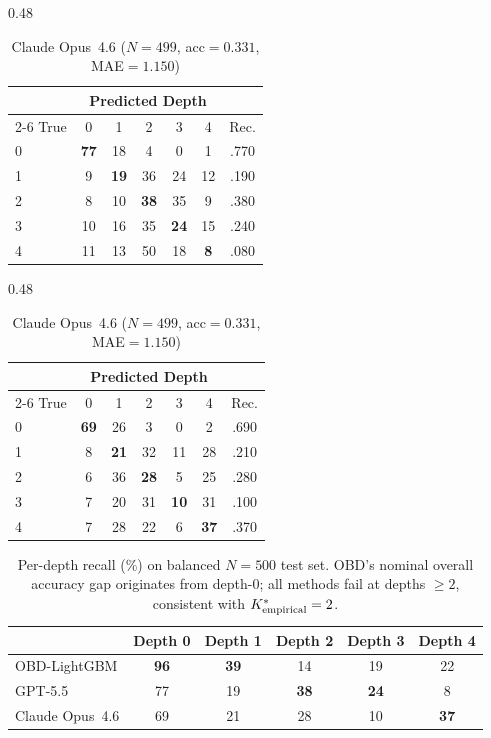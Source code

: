 \begin{table}[t]
  \vspace{0.5em}
  \begin{subtable}{0.48\textwidth}
    \centering
    \caption{GPT-5.5 ($N{=}500$, acc${=}0.332$, MAE${=}1.102$)}
    \label{tab:s3a_gpt55}
    \small
    \begin{tabular}{lcccccc}
      \toprule
      & \multicolumn{5}{c}{Predicted Depth} & \\
      \cmidrule(lr){2-6}
      True & 0 & 1 & 2 & 3 & 4 & Rec. \\
      \midrule
      0 & \textbf{77} & 18 &  4 &  0 &  1 & .770 \\
      1 &  9 & \textbf{19} & 36 & 24 & 12 & .190 \\
      2 &  8 & 10 & \textbf{38} & 35 &  9 & .380 \\
      3 & 10 & 16 & 35 & \textbf{24} & 15 & .240 \\
      4 & 11 & 13 & 50 & 18 &  \textbf{8} & .080 \\
      \bottomrule
    \end{tabular}
  \end{subtable}
  \hfill
  \begin{subtable}{0.48\textwidth}
    \centering
    \caption{Claude Opus~4.6 ($N{=}499$, acc${=}0.331$, MAE${=}1.150$)}
    \label{tab:s3b_claude}
    \small
    \begin{tabular}{lcccccc}
      \toprule
      & \multicolumn{5}{c}{Predicted Depth} & \\
      \cmidrule(lr){2-6}
      True & 0 & 1 & 2 & 3 & 4 & Rec. \\
      \midrule
      0 & \textbf{69} & 26 &  3 &  0 &  2 & .690 \\
      1 &  8 & \textbf{21} & 32 & 11 & 28 & .210 \\
      2 &  6 & 36 & \textbf{28} &  5 & 25 & .280 \\
      3 &  7 & 20 & 31 & \textbf{10} & 31 & .100 \\
      4 &  7 & 28 & 22 &  6 & \textbf{37} & .370 \\
      \bottomrule
    \end{tabular}
  \end{subtable}
\end{table}

\begin{table}[t]
  \centering
  \small
  \caption{Per-depth recall (\%) on balanced $N{=}500$ test set. OBD's nominal overall accuracy gap originates from depth-0; all methods fail at depths $\geq 2$, consistent with ${K^*_{\text{empirical}}} = 2$.}
  \label{tab:s3c_perdepth}
  \begin{tabular}{lccccc}
    \toprule
    & Depth 0 & Depth 1 & Depth 2 & Depth 3 & Depth 4 \\
    \midrule
    OBD-LightGBM & \textbf{96} & \textbf{39} & 14 & 19 & 22 \\
    GPT-5.5      & 77 & 19 & \textbf{38} & \textbf{24} &  8 \\
    Claude Opus~4.6 & 69 & 21 & 28 & 10 & \textbf{37} \\
    \bottomrule
  \end{tabular}
\end{table}

